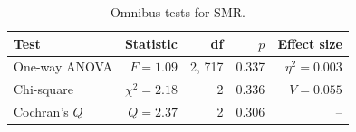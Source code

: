 \begin{table}[H]
\caption{Omnibus tests for SMR.}
\label{tab:sm:omnibus}
\centering
\begin{tabular}{lrrrr}
\toprule
Test & Statistic & df & $p$ & Effect size \\
\midrule
One-way ANOVA & $F = 1.09$ & 2, 717 & 0.337 & $\eta^2 = 0.003$ \\
Chi-square & $\chi^2 = 2.18$ & 2 & 0.336 & $V = 0.055$ \\
Cochran's $Q$ & $Q = 2.37$ & 2 & 0.306 & -- \\
\bottomrule
\end{tabular}
\end{table}
